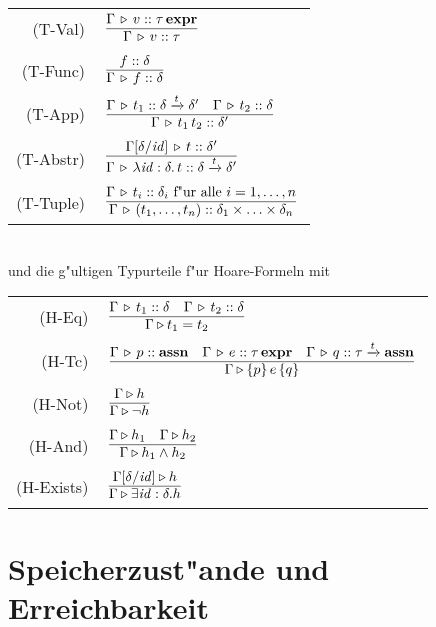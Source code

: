 \documentclass[12pt,a4paper,bigheadings]{scrartcl}
\newcommand{\assn}{\ensuremath{\mathbf{assn}}}
\newcommand{\bexpr}{\ensuremath{\mathbf{expr}}}
\newcommand{\etype}[1]{#1\,\bexpr}
\newcommand{\tto}{\ensuremath{\xrightarrow{t}}}
\newcommand{\RN}[1]{\mbox{{\sc (#1)}}}
\begin{document}
\begin{tabular}{rl}
  \RN{T-Val} & $\regel{\Tj{\Gamma}{v}{\etype{\tau}}}
                      {\Tj{\Gamma}{v}{\tau}}$ \\[1mm]
  \RN{T-Func} & $\regel{\tj{f}{\delta}}
                       {\Tj{\Gamma}{f}{\delta}}$ \\[1mm]
  \RN{T-App} & $\regel{\Tj{\Gamma}{t_1}{\delta \tto \delta'} \quad \Tj{\Gamma}{t_2}{\delta}}
                      {\Tj{\Gamma}{\app{t_1}{t_2}}{\delta'}}$ \\[1mm]
  \RN{T-Abstr} & $\regel{\Tj{\Gamma[\delta/\id]}{t}{\delta'}}
                        {\Tj{\Gamma}{\abstr{\id:\delta}{t}}{\delta \tto \delta'}}$ \\[1mm]
  \RN{T-Tuple} & $\regel{\Tj{\Gamma}{t_i}{\delta_i} \text{ f"ur alle } i=1,\ldots,n}
                        {\Tj{\Gamma}{(t_1,\ldots,t_n)}{\delta_1\times\ldots\times\delta_n}}$
\end{tabular} \\[3mm]
und die g"ultigen Typurteile f"ur Hoare-Formeln mit \\[3mm]
\begin{tabular}{rl}
  \RN{H-Eq} & $\regel{\Tj{\Gamma}{t_1}{\delta} \quad \Tj{\Gamma}{t_2}{\delta}}
                     {\Tjh{\Gamma}{t_1 = t_2}}$ \\[1mm]
  \RN{H-Tc} & $\regel{\Tj{\Gamma}{p}{\assn} \quad \Tj{\Gamma}{e}{\etype{\tau}} \quad \Tj{\Gamma}{q}{\tau} \tto \assn}
                     {\Tjh{\Gamma}{\triple{p}{e}{q}}}$ \\[1mm]
  \RN{H-Not} & $\regel{\Tjh{\Gamma}{h}}
                      {\Tjh{\Gamma}{\neg h}}$ \\[1mm]
  \RN{H-And} & $\regel{\Tjh{\Gamma}{h_1} \quad \Tjh{\Gamma}{h_2}}
                      {\Tjh{\Gamma}{h_1 \wedge h_2}}$ \\[1mm]
  \RN{H-Exists} & $\regel{\Tjh{\Gamma[\delta/\id]}{h}}
                         {\Tjh{\Gamma}{\exists \id:\delta.h}}$
\end{tabular}


\section{Speicherzust"ande und Erreichbarkeit}
\end{document}
